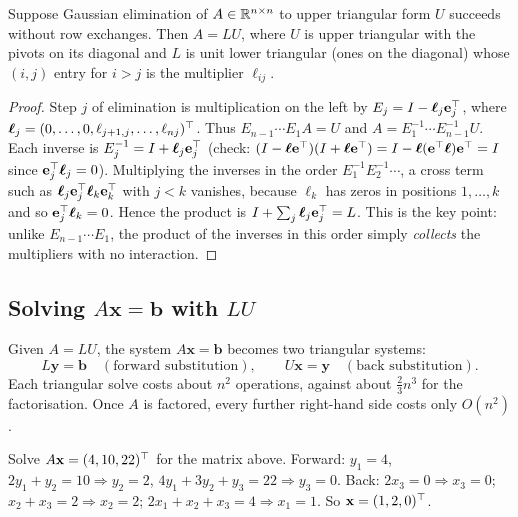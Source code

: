 \begin{theorem}[$LU$ factorisation]\label{thm:lu}
Suppose Gaussian elimination of $A\in\mathbb{R}^{n\times n}$ to upper triangular form $U$ succeeds without row exchanges. Then $A=LU$, where $U$ is upper triangular with the pivots on its diagonal and $L$ is unit lower triangular (ones on the diagonal) whose $(i,j)$ entry for $i>j$ is the multiplier $\ell_{ij}$.
\end{theorem}

\begin{proof}
Step $j$ of elimination is multiplication on the left by $E_j=I-\boldsymbol{\ell}_j\mathbf{e}_j^{\top}$, where $\boldsymbol{\ell}_j=(0,\dots,0,\ell_{j+1,j},\dots,\ell_{nj})^{\top}$. Thus $E_{n-1}\cdots E_1A=U$ and $A=E_1^{-1}\cdots E_{n-1}^{-1}U$. Each inverse is $E_j^{-1}=I+\boldsymbol{\ell}_j\mathbf{e}_j^{\top}$ (check: $(I-\boldsymbol\ell\mathbf{e}^{\top})(I+\boldsymbol\ell\mathbf{e}^{\top})=I-\boldsymbol\ell(\mathbf{e}^{\top}\boldsymbol\ell)\mathbf{e}^{\top}=I$ since $\mathbf{e}_j^{\top}\boldsymbol\ell_j=0$). Multiplying the inverses in the order $E_1^{-1}E_2^{-1}\cdots$, a cross term such as $\boldsymbol\ell_j\mathbf{e}_j^{\top}\boldsymbol\ell_k\mathbf{e}_k^{\top}$ with $j<k$ vanishes, because $\boldsymbol\ell_k$ has zeros in positions $1,\dots,k$ and so $\mathbf{e}_j^{\top}\boldsymbol\ell_k=0$. Hence the product is $I+\sum_j\boldsymbol\ell_j\mathbf{e}_j^{\top}=L$. This is the key point: unlike $E_{n-1}\cdots E_1$, the product of the inverses in this order simply \emph{collects} the multipliers with no interaction.
\end{proof}

\subsection*{Solving $A\mathbf{x}=\mathbf{b}$ with $LU$}

Given $A=LU$, the system $A\mathbf{x}=\mathbf{b}$ becomes two triangular systems:
\[ L\mathbf{y}=\mathbf{b}\quad(\text{forward substitution}),\qquad U\mathbf{x}=\mathbf{y}\quad(\text{back substitution}). \]
Each triangular solve costs about $n^2$ operations, against about $\tfrac23n^3$ for the factorisation. Once $A$ is factored, every further right-hand side costs only $O(n^2)$.

\begin{example}
Solve $A\mathbf{x}=(4,10,22)^{\top}$ for the matrix above. Forward: $y_1=4$, $2y_1+y_2=10\Rightarrow y_2=2$, $4y_1+3y_2+y_3=22\Rightarrow y_3=0$. Back: $2x_3=0\Rightarrow x_3=0$; $x_2+x_3=2\Rightarrow x_2=2$; $2x_1+x_2+x_3=4\Rightarrow x_1=1$. So $\mathbf{x}=(1,2,0)^{\top}$.
\end{example}

